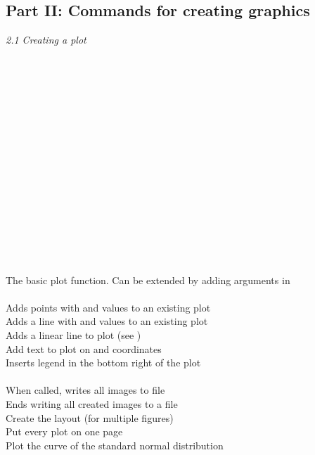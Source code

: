 \subsection{Part II: Commands for creating graphics}

\textit{2.1 Creating a plot} \\
\\
\begin{minipage}[t]{.4\textwidth}
\vspace*{-8pt}
 \\
\\
\\
 \\
 \\
 \\
 \\
 \\
\\
 \\		
 \\
 \\
 \\
 \\
\end{minipage}
\begin{minipage}[t]{.6\textwidth}
The basic plot function. Can be extended by adding arguments in  \\
\\
Adds points with  and  values to an existing plot \\
Adds a line with  and  values to an existing plot \\
Adds a linear line to plot (see ) \\
Add text to plot on  and  coordinates \\
Inserts legend in the bottom right of the plot \\
\\
When called, writes all images to  file  \\
Ends writing all created images to a file  \\
Create the layout (for multiple figures) \\
Put every plot on one page \\
Plot the curve of the standard normal distribution
\end{minipage}
\vspace*{.5cm}

